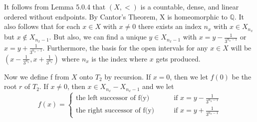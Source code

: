 \documentclass[12pt, a4paper]{scrartcl}
\begin{document}
It follows from Lemma 5.0.4 that $(X, <)$ is a countable, dense, and linear ordered without endpoints. By Cantor's Theorem, X is homeomorphic to $\mathbb{Q}$.
It also follows that for each $x \in X$ with $x \neq 0$ there exists an index $n_x$ with $x \in X_{n_x}$ but $x \notin X_{n_{x}-1}$. But also, we can find a unique $y \in X_{{n_x}-1}$ with $x = y - \frac{1}{3^{n_x -1}}$ or $x = y + \frac{1}{3^{n_x -1}}$.
Furthermore, the basis for the open intervals for any $x \in X$ will be $(x- \frac{1}{3^{n_x}}, x + \frac{1}{3^{n_x}})$ where $n_x$ is the index where $x$ gets produced. \newline

Now we define f from $X$ onto $T_2$ by recursion. If $x = 0$, then we let $f(0)$ be the root $r$ of $T_2$. If $x \neq 0$, then 
$x \in X_{n_x} - X_{n_x -1}$ and we let 
\[
            f(x) = 
            \begin{cases}
                \mbox{the left successor of f(y)} \qquad &\mbox{if } x = y - \frac{1}{3^{n_x -1}} \\
                \mbox{the right successor of f(y)} \qquad & \mbox{if } x = y + \frac{1}{3^{n_x -1}}
            \end{cases}
\]
\end{document}
